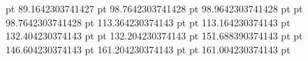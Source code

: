 {{  { pt \vrule width 0.32 pt depth 11.264 pt height 1.03836152344995 pt  }%
  \placebox{-14.0 pt }%
  {89.1642303741427 pt }%
  {%
   }%
  \placebox{-24.736 pt }%
  {98.7642303741428 pt }%
  {%
   }%
  \placebox{-16.0 pt }%
  {98.9642303741428 pt }%
  { pt \vrule width 0.32 pt depth 8.736 pt height 1.03836152344995 pt  }%
  \placebox{-14.0 pt }%
  {98.7642303741428 pt }%
  {%
   }%
  \placebox{-16.0 pt }%
  {113.364230374143 pt }%
  { pt \vrule width 0.32 pt depth 8.736 pt height 1.03836152344995 pt  }%
  \placebox{-14.0 pt }%
  {113.164230374143 pt }%
  {%
   }%
  \placebox{-16.0 pt }%
  {132.404230374143 pt }%
  { pt \vrule width 0.32 pt depth 6.0 pt height 7.03836152344995 pt  }%
  \placebox{-8.0 pt }%
  {132.204230374143 pt }%
  {%
   }%
  \placebox{-16.0 pt }%
  {151.688390374143 pt }%
  { pt \vrule width 0.32 pt depth 5.03836152344995 pt height 8.0 pt  }%
  \placebox{-22.0 pt }%
  {146.604230374143 pt }%
  {%
   }%
  \placebox{-16.0 pt }%
  {161.204230374143 pt }%
  { pt \vrule width 0.32 pt depth 6.0 pt height 7.03836152344995 pt  }%
  \placebox{-8.0 pt }%
  {161.004230374143 pt }%
  {%
   }%
  }%
 \vss}%
\EndLilyPondOutput